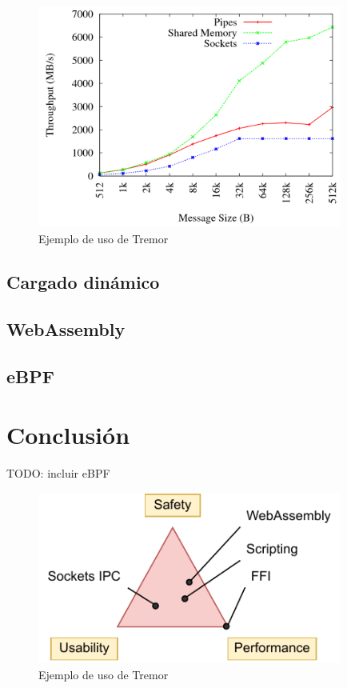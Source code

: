 \begin{figure}
    \centering
    \includegraphics[width=10cm]{./Imagenes/venkataraman2015evaluation2.png}
    \caption{Ejemplo de uso de Tremor}%
    \label{fig:ipc_comparison2}
\end{figure}

\subsection{Cargado dinámico}

\subsection{WebAssembly}

\subsection{eBPF}

\section{Conclusión}

TODO: incluir eBPF

\begin{figure}
    \centering
    \includegraphics[width=10cm]{./Imagenes/triangle.pdf}
    \caption{Ejemplo de uso de Tremor}%
    \label{fig:tech_triangle}
\end{figure}
